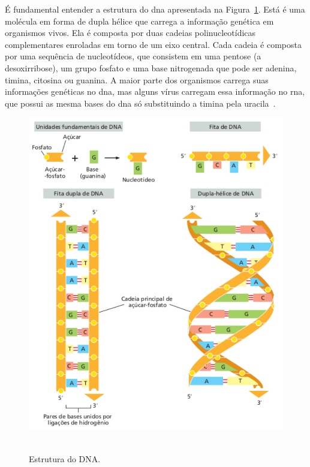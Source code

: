 É fundamental entender a estrutura do \gls{dna} apresentada na Figura~\ref{fig:estruturaDNA}. Está é uma molécula em forma de dupla hélice que carrega a informação genética em organismos vivos. Ela é composta por duas cadeias polinucleotídicas complementares enroladas em torno de um eixo central. Cada cadeia é composta por uma sequência de nucleotídeos, que consistem em uma pentose (a desoxirribose), um grupo fosfato e uma base nitrogenada que pode ser \gls{adenina}, \gls{timina}, \gls{citosina} ou \gls{guanina}. A maior parte dos organismos carrega suas informações genéticas no \gls{dna}, mas alguns vírus carregam essa informação no \gls{rna}, que possui as mesma bases do \gls{dna} só substituindo a \gls{timina} pela \gls{uracila}~\cite{genetica_peter_2017}.

\begin{figure}[htb]
  \centering
  \caption{Estrutura do DNA.}
  \includegraphics[scale=0.6]{figuras/estruturaDNA_02.pdf}
  ~\label{fig:estruturaDNA}
\end{figure}

